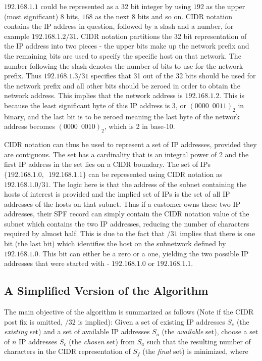 $192.168.1.1$ could be represented as a 32 bit integer by using $192$ as the upper (most significant) 8 bits, $168$ as the next 8 bits and so on. CIDR notation contains the IP address in question, followed by a slash and a number, for example $192.168.1.2/31$. CIDR notation partitions the 32 bit representation of the IP address into two pieces - the upper bits make up the network prefix and the remaining bits are used to specify the specific host on that network. The number following the slash denotes the number of bits to use for the network prefix. Thus $192.168.1.3/31$ specifies that 31 out of the 32 bits should be used for the network prefix and all other bits should be zeroed in order to obtain the network address. This implies that the network address is $192.168.1.2$. This is because the least significant byte of this IP address is 3, or $(0000\enspace0011)_2$ in binary, and the last bit is to be zeroed meaning the last byte of the network address becomes $(0000\enspace0010)_2$, which is 2 in base-10. 

CIDR notation can thus be used to represent a set of IP addresses, provided they are contiguous. The set has a cardinality that is an integral power of 2 and the first IP address in the set lies on a CIDR boundary. The set of IPs $\{192.168.1.0,\enspace192.168.1.1\}$ can be represented using CIDR notation as $192.168.1.0/31$. The logic here is that the address of the subnet containing the hosts of interest is provided and the implied set of IPs is the set of all IP addresses of the hosts on that subnet.  Thus if a customer owns these two IP addresses, their SPF record can simply contain the CIDR notation value of the subnet which contains the two IP addresses, reducing the number of characters required by almost half. This is due to the fact that $/31$ implies that there is one bit (the last bit) which identifies the host on the subnetwork defined by $192.168.1.0$. This bit can either be a zero or a one, yielding the two possible IP addresses that were started with - $192.168.1.0$ or $192.168.1.1$.

\subsection{A Simplified Version of the Algorithm}
The main objective of the algorithm is summarized as follows (Note if the CIDR post fix is omitted, $/32$ is implied): \hfill\break\break
Given a set of existing IP addresses $S_e$ (the \textit{existing} set) and a set of available IP addresses $S_a$ (the \textit{available} set), choose a set of $n$ IP addresses $S_c$ (the \textit{chosen} set) from $S_a$ such that the resulting number of characters in the CIDR representation of $S_f$ (the \textit{final} set) is minimized, where 

